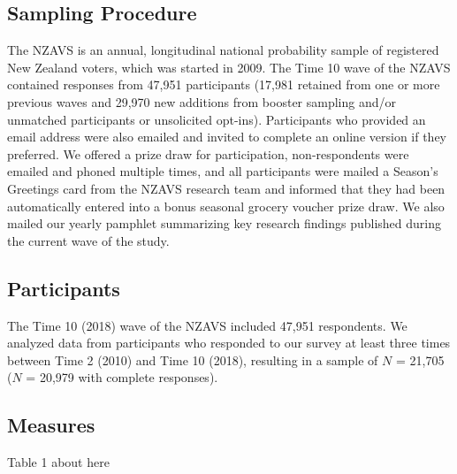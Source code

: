 \documentclass[
  english,
  man,floatsintext]{apa6}
\begin{document}
\hypertarget{sampling-procedure}{%
\subsection{Sampling Procedure}\label{sampling-procedure}}

The NZAVS is an annual, longitudinal national probability sample of registered New Zealand voters, which was started in 2009. The Time 10 wave of the NZAVS contained responses from 47,951 participants (17,981 retained from one or more previous waves and 29,970 new additions from booster sampling and/or unmatched participants or unsolicited opt-ins). Participants who provided an email address were also emailed and invited to complete an online version if they preferred. We offered a prize draw for participation, non-respondents were emailed and phoned multiple times, and all participants were mailed a Season's Greetings card from the NZAVS research team and informed that they had been automatically entered into a bonus seasonal grocery voucher prize draw. We also mailed our yearly pamphlet summarizing key research findings published during the current wave of the study.

\hypertarget{participants}{%
\subsection{Participants}\label{participants}}

The Time 10 (2018) wave of the NZAVS included 47,951 respondents. We analyzed data from participants who responded to our survey at least three times between Time 2 (2010) and Time 10 (2018), resulting in a sample of \(N\) = 21,705 (\(N\) = 20,979 with complete responses).

\hypertarget{measures}{%
\subsection{Measures}\label{measures}}

Table 1 about here
\end{document}
